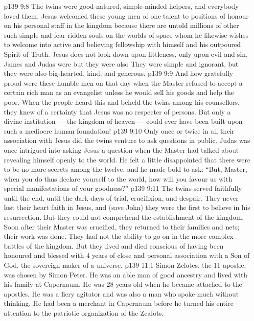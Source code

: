 \vs p139 9:8 \pc The twins were good\hyp{}natured, simple\hyp{}minded helpers, and everybody loved them. Jesus welcomed these young men of one talent to positions of honour on his personal staff in the kingdom because there are untold millions of other such simple and fear\hyp{}ridden souls on the worlds of space whom he likewise wishes to welcome into active and believing fellowship with himself and his outpoured Spirit of Truth. Jesus does not look down upon littleness, only upon evil and sin. James and Judas were  but they were also  They were simple and ignorant, but they were also big\hyp{}hearted, kind, and generous.
\vs p139 9:9 And how gratefully proud were these humble men on that day when the Master refused to accept a certain rich man as an evangelist unless he would sell his goods and help the poor. When the people heard this and beheld the twins among his counsellors, they knew of a certainty that Jesus was no respecter of persons. But only a divine institution --- the kingdom of heaven --- could ever have been built upon such a mediocre human foundation!
\vs p139 9:10 Only once or twice in all their association with Jesus did the twins venture to ask questions in public. Judas was once intrigued into asking Jesus a question when the Master had talked about revealing himself openly to the world. He felt a little disappointed that there were to be no more secrets among the twelve, and he made bold to ask: “But, Master, when you do thus declare yourself to the world, how will you favour us with special manifestations of your goodness?”
\vs p139 9:11 \pc The twins served faithfully until the end, until the dark days of trial, crucifixion, and despair. They never lost their heart faith in Jesus, and (save John) they were the first to believe in his resurrection. But they could not comprehend the establishment of the kingdom. Soon after their Master was crucified, they returned to their families and nets; their work was done. They had not the ability to go on in the more complex battles of the kingdom. But they lived and died conscious of having been honoured and blessed with 4 years of close and personal association with a Son of God, the sovereign maker of a universe.
\vs p139 11:1 Simon Zelotes, the 11 apostle, was chosen by Simon Peter. He was an able man of good ancestry and lived with his family at Capernaum. He was 28 years old when he became attached to the apostles. He was a fiery agitator and was also a man who spoke much without thinking. He had been a merchant in Capernaum before he turned his entire attention to the patriotic organization of the Zealots.
